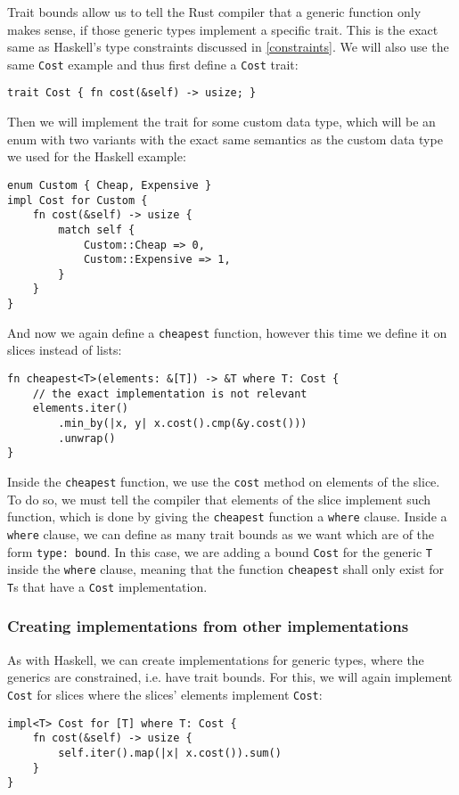Trait bounds allow us to tell the Rust compiler that a generic function only makes sense, if those generic types implement a specific trait. This is the exact same as Haskell's type constraints discussed in \autoref{constraints}. We will also use the same \verb|Cost| example and thus first define a \verb|Cost| trait:
\begin{verbatim}
trait Cost { fn cost(&self) -> usize; }
\end{verbatim}
Then we will implement the trait for some custom data type, which will be an enum with two variants with the exact same semantics as the custom data type we used for the Haskell example:
\begin{verbatim}
enum Custom { Cheap, Expensive }
impl Cost for Custom {
    fn cost(&self) -> usize {
        match self {
            Custom::Cheap => 0,
            Custom::Expensive => 1,
        }
    }
}
\end{verbatim}
And now we again define a \verb|cheapest| function, however this time we define it on slices instead of lists:
\begin{verbatim}
fn cheapest<T>(elements: &[T]) -> &T where T: Cost {
    // the exact implementation is not relevant
    elements.iter()
        .min_by(|x, y| x.cost().cmp(&y.cost()))
        .unwrap()
}
\end{verbatim}
Inside the \verb|cheapest| function, we use the \verb|cost| method on elements of the slice. To do so, we must tell the compiler that elements of the slice implement such function, which is done by giving the \verb|cheapest| function a \verb|where| clause. Inside a \verb|where| clause, we can define as many trait bounds as we want which are of the form \verb|type: bound|. In this case, we are adding a bound \verb|Cost| for the generic \verb|T| inside the \verb|where| clause, meaning that the function \verb|cheapest| shall only exist for \verb|T|s that have a \verb|Cost| implementation.

\subsubsection{Creating implementations from other implementations}

As with Haskell, we can create implementations for generic types, where the generics are constrained, i.e. have trait bounds. For this, we will again implement \verb|Cost| for slices where the slices' elements implement \verb|Cost|:
\begin{verbatim}
impl<T> Cost for [T] where T: Cost {
    fn cost(&self) -> usize {
        self.iter().map(|x| x.cost()).sum()
    }
}
\end{verbatim}

